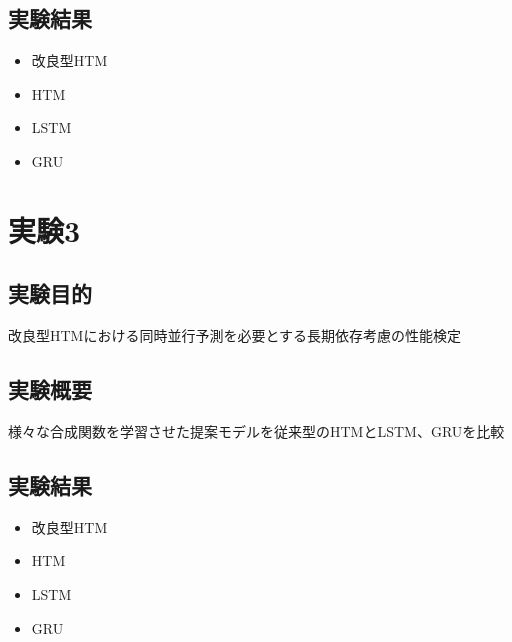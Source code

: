\subsection{実験結果}

\begin{itemize}
  \item 改良型HTM
  \item HTM
  \item LSTM
  \item GRU
\end{itemize}

\section{実験3}
\subsection{実験目的}
改良型HTMにおける同時並行予測を必要とする長期依存考慮の性能検定

\subsection{実験概要}
様々な合成関数を学習させた提案モデルを従来型のHTMとLSTM、GRUを比較

\subsection{実験結果}

\begin{itemize}
  \item 改良型HTM
  \item HTM
  \item LSTM
  \item GRU
\end{itemize}
